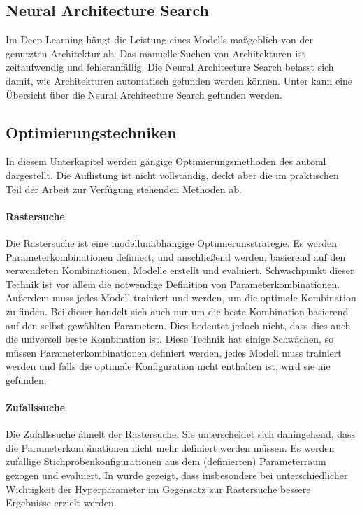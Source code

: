 	\subsection{Neural Architecture Search}
	\label{subsec:NeuralArchitectureSearch}
	Im Deep Learning hängt die Leistung eines Modells maßgeblich von der genutzten Architektur ab. Das manuelle Suchen von Architekturen ist zeitaufwendig und fehleranfällig. Die Neural Architecture Search befasst sich damit, wie Architekturen automatisch gefunden werden können. Unter \cite{Elsken.2019} kann eine Übersicht über die Neural Architecture Search gefunden werden. 	

	\subsection{Optimierungstechniken}
	\label{subsec:Optimierungstechniken}
	In diesem Unterkapitel werden gängige Optimierungsmethoden des \ac{automl} dargestellt. Die Auflistung ist nicht vollständig, deckt aber die im praktischen Teil der Arbeit zur Verfügung stehenden Methoden ab.  
	
	\paragraph{Rastersuche}
	Die Rastersuche \cite{Michelucci.2018} ist eine modellunabhängige Optimierunsstrategie. Es werden Parameterkombinationen definiert, und anschließend werden, basierend auf den verwendeten Kombinationen, Modelle erstellt und evaluiert. Schwachpunkt dieser Technik ist vor allem die notwendige Definition von Parameterkombinationen. Außerdem muss jedes Modell trainiert und werden, um die optimale Kombination zu finden. 
	Bei dieser handelt sich auch nur um die beste Kombination basierend auf den selbst gewählten Parametern. Dies bedeutet jedoch nicht, dass dies auch die universell beste Kombination ist.	
	 Diese Technik hat einige Schwächen, so müssen Parameterkombinationen definiert werden, jedes Modell muss trainiert werden und falls die optimale Konfiguration nicht enthalten ist, wird sie nie gefunden. 
	 
	\paragraph{Zufallssuche}
	Die Zufallssuche ähnelt der Rastersuche. Sie unterscheidet sich dahingehend, dass die Parameterkombinationen nicht mehr definiert werden müssen. Es werden zufällige Stichprobenkonfigurationen aus dem (definierten) Parameterraum gezogen und evaluiert. 
	In \cite{BergstraJamesandYoshuaBengio..2012} wurde gezeigt, dass insbesondere bei unterschiedlicher Wichtigkeit der Hyperparameter im Gegensatz zur Rastersuche bessere Ergebnisse erzielt werden. 

